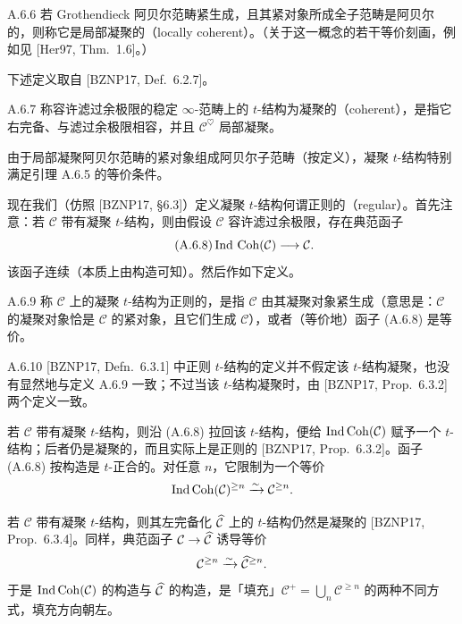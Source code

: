 \begin{defn}{A.6.6}\label{defn:a4-17-A-6-6}
若 Grothendieck 阿贝尔范畴紧生成，且其紧对象所成全子范畴是阿贝尔的，则称它是局部凝聚的（locally coherent）。（关于这一概念的若干等价刻画，例如见 [Her97, Thm.~1.6]。）
\end{defn}

下述定义取自 [BZNP17, Def.~6.2.7]。

\begin{defn}{A.6.7}\label{defn:a4-17-A-6-7}
称容许滤过余极限的稳定 $\infty$-范畴上的 $t$-结构为凝聚的（coherent），是指它右完备、与滤过余极限相容，并且 $\mathcal C^{\heartsuit}$ 局部凝聚。
\end{defn}

由于局部凝聚阿贝尔范畴的紧对象组成阿贝尔子范畴（按定义），凝聚 $t$-结构特别满足引理 A.6.5 的等价条件。

现在我们（仿照 [BZNP17, §6.3]）定义凝聚 $t$-结构何谓正则的（regular）。首先注意：若 $\mathcal C$ 带有凝聚 $t$-结构，则由假设 $\mathcal C$ 容许滤过余极限，存在典范函子
\begin{equation}\tag{A.6.8}\label{eq:a4-17-A-6-8}
\operatorname{Ind}\,\operatorname{Coh}(\mathcal C)\longrightarrow\mathcal C.
\end{equation}
该函子连续（本质上由构造可知）。然后作如下定义。

\begin{defn}{A.6.9}\label{defn:a4-17-A-6-9}
称 $\mathcal C$ 上的凝聚 $t$-结构为正则的，是指 $\mathcal C$ 由其凝聚对象紧生成（意思是：$\mathcal C$ 的凝聚对象恰是 $\mathcal C$ 的紧对象，且它们生成 $\mathcal C$），或者（等价地）函子 (A.6.8) 是等价。
\end{defn}

\begin{rem}{A.6.10}\label{rem:a4-17-A-6-10}
[BZNP17, Defn.~6.3.1] 中正则 $t$-结构的定义并不假定该 $t$-结构凝聚，也没有显然地与定义 A.6.9 一致；不过当该 $t$-结构凝聚时，由 [BZNP17, Prop.~6.3.2] 两个定义一致。
\end{rem}


若 $\mathcal C$ 带有凝聚 $t$-结构，则沿 (A.6.8) 拉回该 $t$-结构，便给 $\operatorname{Ind}\operatorname{Coh}(\mathcal C)$ 赋予一个 $t$-结构；后者仍是凝聚的，而且实际上是正则的 [BZNP17, Prop.~6.3.2]。函子 (A.6.8) 按构造是 $t$-正合的。对任意 $n$，它限制为一个等价
\[
\operatorname{Ind}\operatorname{Coh}(\mathcal C)^{\geq n}\xrightarrow{\sim}\mathcal C^{\geq n}.
\]

若 $\mathcal C$ 带有凝聚 $t$-结构，则其左完备化 $\widehat{\mathcal C}$ 上的 $t$-结构仍然是凝聚的 [BZNP17, Prop.~6.3.4]。同样，典范函子 $\mathcal C\to\widehat{\mathcal C}$ 诱导等价
\[
\mathcal C^{\geq n}\xrightarrow{\sim}\widehat{\mathcal C}^{\geq n}.
\]
于是 $\operatorname{Ind}\operatorname{Coh}(\mathcal C)$ 的构造与 $\widehat{\mathcal C}$ 的构造，是「填充」$\mathcal C^+=\bigcup_n\mathcal C^{\geq n}$ 的两种不同方式，填充方向朝左。

